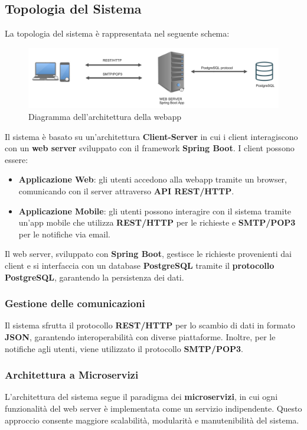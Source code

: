 \subsection{Topologia del Sistema}

La topologia del sistema è rappresentata nel seguente schema:

\begin{figure}[h]
    \centering
    \includegraphics[scale=0.18]{images/topologia.jpg}
    \caption{Diagramma dell'architettura della webapp}
\end{figure}

Il sistema è basato su un'architettura \textbf{Client-Server} in cui i client interagiscono con un \textbf{web server} sviluppato con il framework \textbf{Spring Boot}. I client possono essere:

\begin{itemize}
    \item \textbf{Applicazione Web}: gli utenti accedono alla webapp tramite un browser, comunicando con il server attraverso \textbf{API REST/HTTP}.
    \item \textbf{Applicazione Mobile}: gli utenti possono interagire con il sistema tramite un'app mobile che utilizza \textbf{REST/HTTP} per le richieste e \textbf{SMTP/POP3} per le notifiche via email.
\end{itemize}

Il web server, sviluppato con \textbf{Spring Boot}, gestisce le richieste provenienti dai client e si interfaccia con un database \textbf{PostgreSQL} tramite il \textbf{protocollo PostgreSQL}, garantendo la persistenza dei dati.

\subsubsection{Gestione delle comunicazioni}
Il sistema sfrutta il protocollo \textbf{REST/HTTP} per lo scambio di dati in formato \textbf{JSON}, garantendo interoperabilità con diverse piattaforme. Inoltre, per le notifiche agli utenti, viene utilizzato il protocollo \textbf{SMTP/POP3}.

\subsubsection{Architettura a Microservizi}
L'architettura del sistema segue il paradigma dei \textbf{microservizi}, in cui ogni funzionalità del web server è implementata come un servizio indipendente. Questo approccio consente maggiore scalabilità, modularità e manutenibilità del sistema.